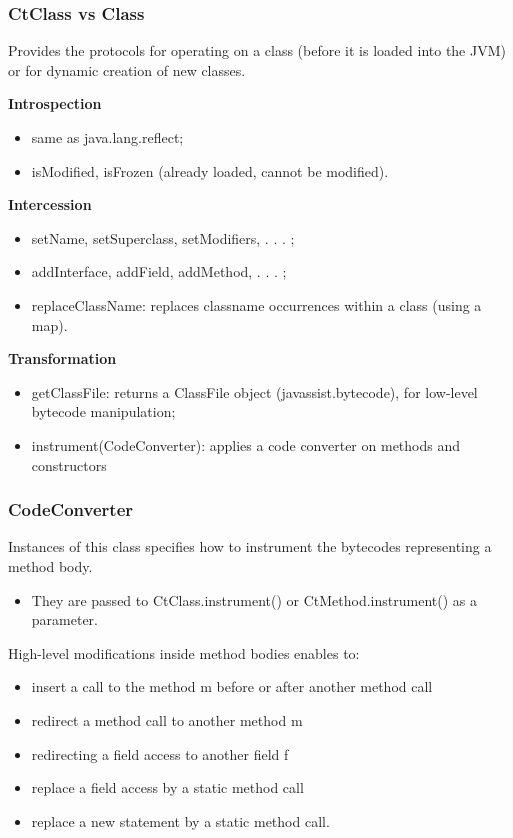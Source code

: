 \subsubsection{CtClass vs Class}

Provides the protocols for operating on a class (before it is loaded into the JVM) or for dynamic creation of new classes.

\textbf{Introspection}

\begin{itemize}
	\item same as java.lang.reflect;
	\item isModified, isFrozen (already loaded, cannot be modified).
\end{itemize}

\textbf{Intercession}

\begin{itemize}
	\item setName, setSuperclass, setModifiers, . . . ;
	\item addInterface, addField, addMethod, . . . ;
	\item replaceClassName: replaces classname occurrences within a class (using a map).
\end{itemize}

\textbf{Transformation}

\begin{itemize}
	\item getClassFile: returns a ClassFile object (javassist.bytecode), for low-level bytecode manipulation;
	\item instrument(CodeConverter): applies a code converter on methods and constructors
\end{itemize}

\subsubsection{CodeConverter}

Instances of this class specifies how to instrument the bytecodes representing a method body.

\begin{itemize}
	\item They are passed to CtClass.instrument() or CtMethod.instrument() as a parameter.
\end{itemize}

High-level modifications inside method bodies enables to:

\begin{itemize}
	\item insert a call to the method m before or after another method call
	\item redirect a method call to another method m
	\item redirecting a field access to another field f
	\item replace a field access by a static method call
	\item replace a new statement by a static method call.
\end{itemize}


